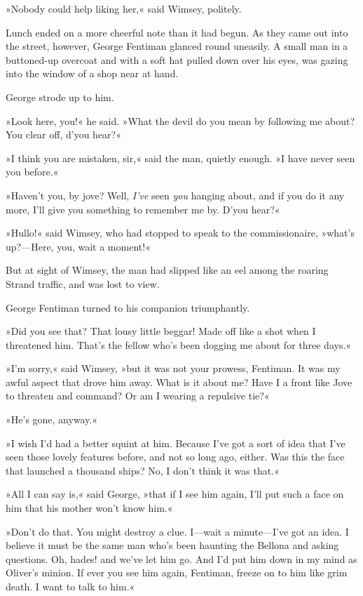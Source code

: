 »Nobody could help liking her,« said Wimsey, politely.

Lunch ended on a more cheerful note than it had begun. As they came out into the street, however, George Fentiman glanced round uneasily. A small man in a buttoned-up overcoat and with a soft hat pulled down over his eyes, was gazing into the window of a shop near at hand.

George strode up to him.

»Look here, you!« he said. »What the devil do you mean by following me about? You clear off, d'you hear?«

»I think you are mistaken, sir,« said the man, quietly enough. »I have never seen you before.«

»Haven't you, by jove? Well, \textit{I've} seen \textit{you} hanging about, and if you do it any more, I'll give you something to remember me by. D'you hear?«

»Hullo!« said Wimsey, who had stopped to speak to the commissionaire, »what's up?—Here, you, wait a moment!«

But at sight of Wimsey, the man had slipped like an eel among the roaring Strand traffic, and was lost to view.

George Fentiman turned to his companion triumphantly.

»Did you see that? That lousy little beggar! Made off like a shot when I threatened him. That's the fellow who's been dogging me about for three days.«

»I'm sorry,« said Wimsey, »but it was not your prowess, Fentiman. It was my awful aspect that drove him away. What is it about me? Have I a front like Jove to threaten and command? Or am I wearing a repulsive tie?«

»He's gone, anyway.«

»I wish I'd had a better squint at him. Because I've got a sort of idea that I've seen those lovely features before, and not so long ago, either. Was this the face that launched a thousand ships? No, I don't think it was that.«

»All I can say is,« said George, »that if I see him again, I'll put such a face on him that his mother won't know him.«

»Don't do that. You might destroy a clue. I—wait a minute—I've got an idea. I believe it must be the same man who's been haunting the Bellona and asking questions. Oh, hades! and we've let him go. And I'd put him down in my mind as Oliver's minion. If ever you see him again, Fentiman, freeze on to him like grim death. I want to talk to him.«